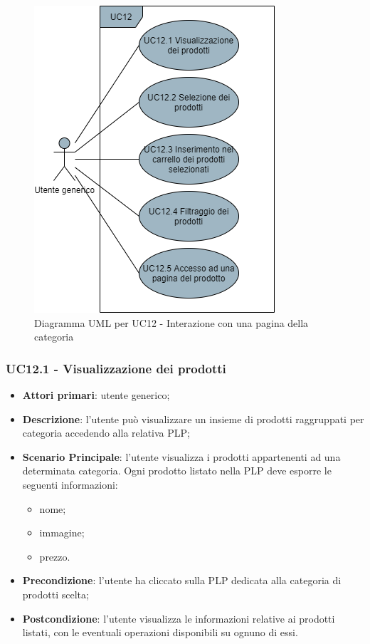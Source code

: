 \begin{figure}[H]
\centering
\includegraphics[scale=0.6]{res/UseCase/Immagini/InterazionePaginaCategoria}
\caption{Diagramma UML per UC12 - Interazione con una pagina della categoria}
\end{figure}

\subsubsection{UC12.1 - Visualizzazione dei prodotti}
\begin{itemize}
\item \textbf{Attori primari}: utente generico;
\item \textbf{Descrizione}: l'utente può visualizzare un insieme di prodotti raggruppati per categoria accedendo alla relativa PLP;
\item \textbf{Scenario Principale}: l'utente visualizza i prodotti appartenenti ad una determinata categoria. Ogni prodotto listato nella PLP deve esporre le seguenti informazioni:
\begin{itemize}
\item nome;
\item immagine;
\item prezzo.
\end{itemize}
\item \textbf{Precondizione}: l'utente ha cliccato sulla PLP dedicata alla categoria di prodotti scelta;
\item \textbf{Postcondizione}: l'utente visualizza le informazioni relative ai prodotti listati, con le eventuali operazioni disponibili su ognuno di essi.
\end{itemize}

